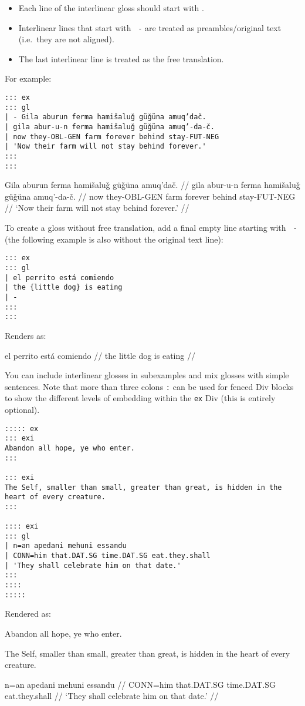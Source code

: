 \documentclass[
  letterpaper,
  DIV=11,
  numbers=noendperiod]{scrartcl}
\providecommand{\tightlist}{%
  \setlength{\itemsep}{0pt}\setlength{\parskip}{0pt}}
\let\expexgla\gla
\let\gla\expexgla
\begin{document}
\begin{itemize}
\tightlist
\item
  Each line of the interlinear gloss should start with
  \texttt{\textbar{}}.
\item
  Interlinear lines that start with \texttt{\textbar{}\ -} are treated
  as preambles/original text (i.e.~they are not aligned).
\item
  The last interlinear line is treated as the free translation.
\end{itemize}

For example:

\begin{verbatim}
::: ex
::: gl
| - Gila aburun ferma hamišaluǧ güǧüna amuq’dač.
| gila abur-u-n ferma hamišaluǧ güǧüna amuq’-da-č.
| now they-OBL-GEN farm forever behind stay-FUT-NEG
| 'Now their farm will not stay behind forever.'
:::
:::
\end{verbatim}

\label{ex-lez}
\pex
\begingl
\glpreamble  Gila aburun ferma hamišaluǧ güǧüna amuq’dač. //
\gla gila abur-u-n ferma hamišaluǧ güǧüna amuq’-da-č. //
\glb now they-OBL-GEN farm forever behind stay-FUT-NEG //
\glft ‘Now their farm will not stay behind forever.’ //
\endgl
\xe

To create a gloss without free translation, add a final empty line
starting with \texttt{\textbar{}\ -} (the following example is also
without the original text line):

\begin{verbatim}
::: ex
::: gl
| el perrito está comiendo
| the {little dog} is eating
| -
:::
:::
\end{verbatim}

Renders as:

\label{ex-sp}
\pex
\begingl
\gla el perrito está comiendo //
\glb the {little dog} is eating //
\endgl
\xe

You can include interlinear glosses in subexamples and mix glosses with
simple sentences. Note that more than three colons \texttt{:} can be
used for fenced Div blocks to show the different levels of embedding
within the \texttt{ex} Div (this is entirely optional).

\begin{verbatim}
::::: ex
::: exi
Abandon all hope, ye who enter.
:::

::: exi
The Self, smaller than small, greater than great, is hidden in the heart of every creature.
:::

:::: exi
::: gl
| n=an apedani mehuni essandu
| CONN=him that.DAT.SG time.DAT.SG eat.they.shall
| 'They shall celebrate him on that date.'
:::
::::
:::::
\end{verbatim}

Rendered as:

\pex
\a Abandon all hope, ye who enter.

\a The Self, smaller than small, greater than great, is hidden in the
heart of every creature.

\a \begingl
\gla n=an apedani mehuni essandu //
\glb CONN=him that.DAT.SG time.DAT.SG eat.they.shall //
\glft ‘They shall celebrate him on that date.’ //
\endgl

\xe
\end{document}
